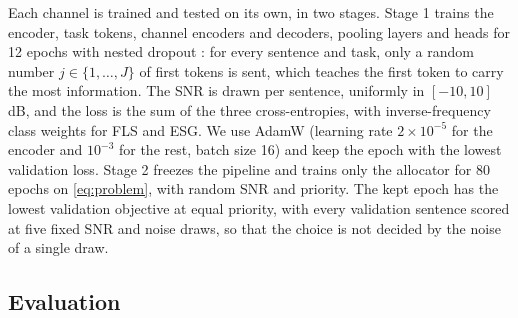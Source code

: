 \documentclass[conference]{IEEEtran}
\begin{document}
Each channel is trained and tested on its own, in two stages. Stage 1
trains the encoder, task tokens, channel encoders and decoders, pooling
layers and heads for 12 epochs with nested dropout
\cite{rippel2014nested}: for every sentence and task, only a random
number $j \in \{1, \ldots, J\}$ of first tokens is sent, which teaches
the first token to carry the most information. The SNR is drawn per
sentence, uniformly in $[-10, 10]$\,dB, and the loss is the sum of the
three cross-entropies, with inverse-frequency class weights for FLS
and ESG. We use AdamW (learning rate $2{\times}10^{-5}$ for the encoder
and $10^{-3}$ for the rest, batch size 16) and keep the epoch with the
lowest validation loss. Stage 2 freezes the pipeline and trains only
the allocator for 80 epochs on \eqref{eq:problem}, with random SNR and
priority. The kept epoch has the lowest validation objective at equal
priority, with every validation sentence scored at five fixed SNR and
noise draws, so that the choice is not decided by the noise of a
single draw.

\subsection{Evaluation}
\end{document}
